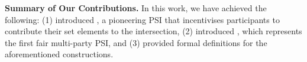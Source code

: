 \vspace{-4mm}
\begin{paragraph}
%
{\textbf{Summary of Our Contributions.}} In this work, we have achieved the following: (1) introduced \withRew, a pioneering PSI that incentivises participants to contribute their set elements to the intersection, (2) introduced \withFai, which represents the first fair multi-party PSI, and (3) provided formal definitions for the aforementioned constructions.
%
\end{paragraph}










%












%













